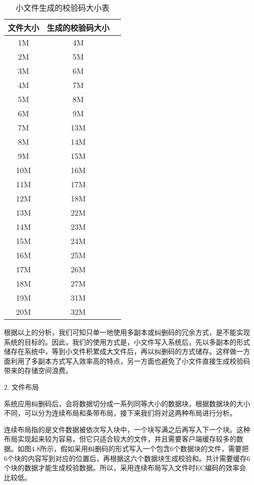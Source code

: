 \begin{table}[h]
  \centering
  \caption{小文件生成的校验码大小表}
  \begin{tabular}{ccc}
    \toprule
    文件大小     & 生成的校验码大小 \\
    \midrule
    1M & 4M                     \\
    2M & 5M                     \\
    3M & 6M                     \\
    4M & 7M                     \\
    5M & 8M                     \\
    6M & 9M                     \\
    7M & 13M                     \\
    8M & 14M                     \\
    9M & 15M                     \\
    10M & 16M                     \\
    11M & 17M                     \\
    12M & 18M                     \\
    13M & 22M                     \\
    14M & 23M                     \\
    15M & 24M                     \\
    16M & 25M                     \\
    17M & 26M                     \\
    18M & 27M                     \\
    19M & 31M                     \\
    20M & 32M                     \\
    \bottomrule
  \end{tabular}
\end{table}

根据以上的分析，我们可知只单一地使用多副本或纠删码的冗余方式，是不能实现系统的目标的。因此，我们的使用方式是，小文件写入系统后，先以多副本的形式储存在系统中，等到小文件积累成大文件后，再以纠删码的方式储存。这样做一方面利用了多副本方式写入效率高的特点，另一方面也避免了小文件直接生成校验码带来的存储空间浪费。

2. 文件布局

系统应用纠删码后，会将数据切分成一系列同等大小的数据块，根据数据块的大小不同，可以分为连续布局和条带布局，接下来我们将对这两种布局进行分析。

连续布局指的是文件数据被依次写入块中，一个块写满之后再写入下一个块。这种布局实现起来较为容易，但它只适合较大的文件，并且需要客户端缓存较多的数据。如图4.8所示，假如采用纠删码的形式写入一个包含6个数据块的文件，需要把6个块的内容写到对应的位置后，再根据这六个数据块生成校验和。共计需要缓存6个块的数据才能生成校验数据。所以，采用连续布局写入文件时EC编码的效率会比较低。

